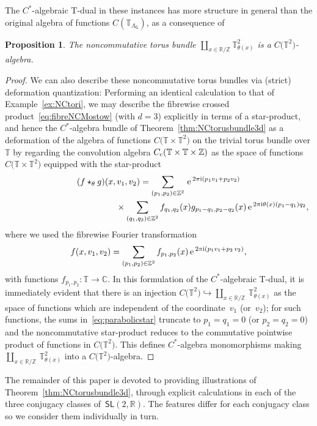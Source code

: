 \documentclass[10pt,a4paper]{amsart}
\numberwithin{equation}{section}
\def\nn{\nonumber}
\newcommand{\Z}{\zed}
\def\ii{{{\rm i}}}
\newcommand{\sfG}{\mathsf{G}}
\newcommand{\sfSL}{\mathsf{SL}}
\newcommand{\R}{\real}
\newcommand{\complex}{{\mathbb C}} %
\newcommand{\zed}{{\mathbb Z}} %
\newcommand{\real}{{\mathbb R}} %
\newcommand{\torus}{{\mathbb T}} %
\def\nn{\nonumber}
\def\e{{\,\rm e}\,}
\newtheorem{Proposition}[Theorem]{Proposition}
 { \theoremstyle{definition}
\newtheorem{Definition}[Theorem]{Definition}
\newtheorem{Note}[Theorem]{Note}
\newtheorem{Example}[Theorem]{Example}
\newtheorem{Remark}[Theorem]{Remark} }
\begin{document}
The $C^*$-algebraic T-dual in these instances has more structure in general than the
original algebra of functions $C(\torus_{\Lambda_\sfG})$, as a consequence of
\begin{Proposition}\label{prop:starproduct3d}
The noncommutative torus bundle $\coprod_{x\in\R/\Z}
\torus_{\theta(x)}^2$ is a $C\big(\torus^2\big)$-algebra.
\end{Proposition}
\begin{proof}
We can also describe these noncommutative torus bundles via (strict)
deformation quantization: Performing an identical calculation to that of
Example~\ref{ex:NCtori}, we may describe the fibrewise crossed product~\eqref{eq:fibreNCMostow} (with $d=3$) explicitly in terms of a
star-product, and hence the $C^*$-algebra bundle of Theorem~\ref{thm:NCtorusbundle3d}
as a deformation of the algebra of functions
$C\big(\torus\times\torus^2\big)$ on the trivial torus bundle over $\torus$ by regarding the convolution algebra $C_{\rm
 c}(\torus\times\torus\times\zed)$ as the space of functions
$C\big(\torus\times\torus^2\big)$ equipped with the star-product
\begin{gather}
(f\star_{\theta} g)(x,v_1,v_2) = \sum_{(p_1,p_2)\in\zed^2}
\e^{2\pi\ii (p_1 v_1+p_2 v_2)} \nn \\
\hphantom{(f\star_{\theta} g)(x,v_1,v_2) = \sum_{(p_1,p_2)\in\zed^2} }{} \times \sum_{(q_1,q_2)\in\zed^2}
f_{q_1,q_2}(x) g_{p_1-q_1,p_2-q_2}(x) \e^{2\pi\ii
 \theta(x) (p_1-q_1) q_2},\label{eq:parabolicstar}
\end{gather}
where we used the fibrewise Fourier transformation
\[
f(x,v_1,v_2)=\sum_{(p_1,p_2)\in\zed^2} f_{p_1,p_2}(x) \e^{2\pi\ii(p_1 v_1+
 p_2\,v_2)} ,
\]
with functions $f_{p_1,p_2}\colon \torus\to\complex$.
In this formulation of the
$C^*$-algebraic T-dual, it is immediately evident that there is an injection
$C\big(\torus^2\big)\hookrightarrow \coprod_{x\in\R/\Z}\,
\torus_{\theta(x)}^2$ as the space of functions which are independent of
the coordinate~$v_1$ (or~$v_2$); for such functions, the sums in~\eqref{eq:parabolicstar} truncate to $p_1=q_1=0$ (or $p_2=q_2=0$) and
the noncommutative star-product reduces to the commutative pointwise
product of functions in $C\big(\torus^2\big)$. This defines $C^*$-algebra
monomorphisms making $\coprod_{x\in\R/\Z}\,
\torus_{\theta(x)}^2$ into a $C\big(\torus^2\big)$-algebra.
\end{proof}

The remainder of this paper is devoted to providing illustrations of
Theorem~\ref{thm:NCtorusbundle3d}, through explicit calculations in
each of the three conjugacy classes of~$\sfSL(2,\R)$. The features
differ for each conjugacy class so we consider them individually in
turn.
\end{document}
